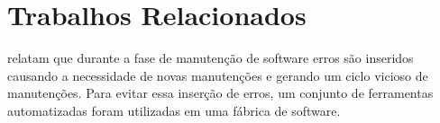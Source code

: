 \chapter{Trabalhos Relacionados}\label{trabalhorel}

 relatam que durante a fase de manutenção de software erros são inseridos causando a necessidade de novas manutenções e gerando um ciclo vicioso de manutenções. Para evitar essa inserção de erros, um conjunto de ferramentas automatizadas foram utilizadas em uma fábrica de software.

	